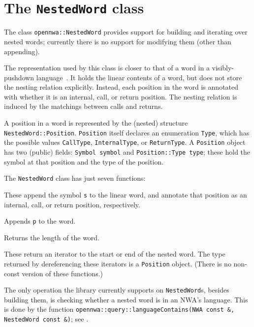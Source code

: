 \section{The \texttt{NestedWord} class}
\label{Se:class-nested-word}

The class \texttt{opennwa::NestedWord} provides support for
building and iterating over nested words; currently there
is no support for modifying them (other than appending).

The representation used by this class is closer to that of a word in a
visibly-pushdown language~\cite{JACM:AM2009}. It holds the linear contents of
a word, but does not store the nesting relation explicitly. Instead, each
position in the word is annotated with whether it is an internal, call, or
return position. The nesting relation is induced by the matchings between
calls and returns.

A position in a word is represented by the (nested) structure
\texttt{NestedWord::Position}. \texttt{Position} itself declares an
enumeration \texttt{Type}, which has the possible values \texttt{CallType},
\texttt{InternalType}, or \texttt{ReturnType}.
A \texttt{Position} object has two (public) fields: \texttt{Symbol symbol}
and \texttt{Position::Type type}; these hold the symbol at that position and
the type of the position.


The \texttt{NestedWord} class has just seven functions:
\begin{functionlist}
    These append the symbol \texttt{s} to the linear word, and annotate that
    position as an internal, call, or return position, respectively.

    Appends \texttt{p} to the word.

    Returns the length of the word.

    These return an iterator to the start or end
    of the nested word. The type returned by dereferencing these iterators is
    a \texttt{Position} object. (There is no non-const version of these
    functions.)
\end{functionlist}

The only operation the library currently supports on
\texttt{NestedWord}s, besides building them, is checking whether a
nested word is in an NWA's language. This is done by
the function \texttt{opennwa::query::languageContains(\mbox{NWA const \&}, \mbox{NestedWord const \&})}; see
.

